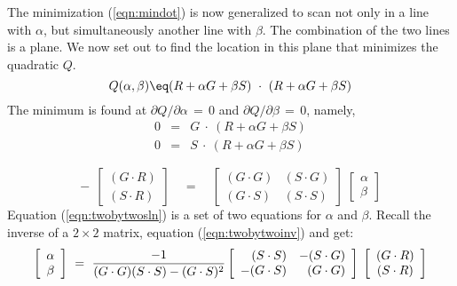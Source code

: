 \par
The minimization (\ref{eqn:mindot}) is now generalized
to scan not only in a line with $\alpha$,
but simultaneously another line with $\beta$.
The combination of the two lines is a plane.
We now set out to find the location in this plane that minimizes the quadratic $Q$.
\begin{equation}
Q(\alpha ,\beta ) \eq
( R + \alpha G + \beta S) \ \cdot\  (R + \alpha G + \beta S )
\label{eqn:cgqf}
\end{equation}
The minimum is found at  $\partial Q / \partial \alpha \,=\,0$  and
$\partial Q / \partial \beta \,=\,0$, namely,
\begin{eqnarray}
0 &=& G \ \cdot\  ( R + \alpha G + \beta S )
\\
0 &=& S \ \cdot\  ( R + \alpha G + \beta S )
\end{eqnarray}
\par
\begin{equation}
\label{eqn:twobytwosln}
-\ \ 
\left[ 
\begin{array}{c}
  (G\cdot R) \\
  (S\cdot R) \end{array} \right]
\quad = \quad
\left[ 
\begin{array}{rr}
   (G \cdot G) & (S \cdot G)  \\
   (G \cdot S) & (S \cdot S)  \end{array} \right] 
\;
\left[ 
\begin{array}{c}
  \alpha \\ 
  \beta \end{array} \right] 
\end{equation}
Equation
(\ref{eqn:twobytwosln})
is a set of two equations for $\alpha$ and $\beta$.
Recall the inverse of a $2\times 2$ matrix, equation
(\ref{eqn:twobytwoinv})
and get:
\begin{equation}
\label{eqn:twobytwosln}
\left[ 
\begin{array}{c}
  \alpha \\ 
  \beta \end{array} \right] 
\ = \ 
        {-1 \over (G\cdot G)(S\cdot S)-(G\cdot S)^2}
\left[ 
\begin{array}{rr}
  (S \cdot S) & -(S \cdot G)  \\
  -(G \cdot S) & (G \cdot G)  \end{array} \right] 
\; \left[ 
\begin{array}{c}
  (G\cdot R) \\
  (S\cdot R) \end{array} \right]
\end{equation}
